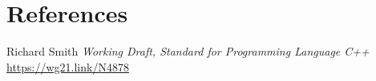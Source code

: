 \documentclass{wg21}
\begin{document}
\section{References}
\renewcommand{\section}[2]{}%



\begin{thebibliography}{9}
    Richard Smith
    \emph{Working Draft, Standard for Programming Language C++}\newline
    \url{https://wg21.link/N4878}

\end{thebibliography}
\end{document}
